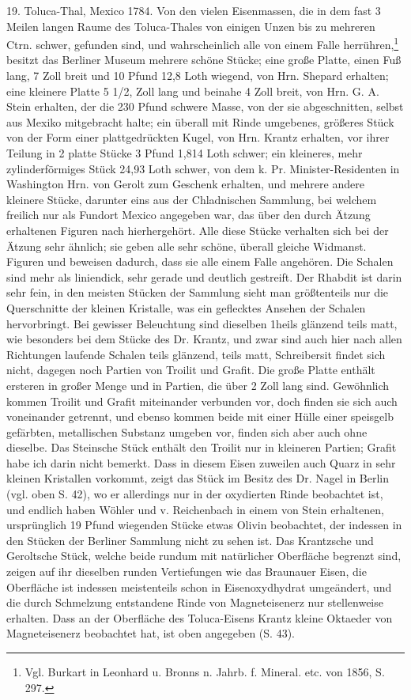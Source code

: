 \documentclass[a4paper, 11pt, oneside]{article}
\begin{document}
19. Toluca-Thal, Mexico 1784. Von den vielen Eisenmassen, die in dem fast 3 Meilen langen Raume des Toluca-Thales von einigen Unzen bis zu mehreren Ctrn. schwer, gefunden sind, und wahrscheinlich alle von einem Falle herrühren,\footnote{Vgl. Burkart in Leonhard u. Bronns n. Jahrb. f. Mineral. etc. von 1856, S. 297.} besitzt das Berliner Museum mehrere schöne Stücke; eine große Platte, einen Fuß lang, 7 Zoll breit und 10 Pfund 12,8 Loth wiegend, von Hrn. Shepard erhalten; eine kleinere Platte 5 1/2, Zoll lang und beinahe 4 Zoll breit, von Hrn. G. A. Stein erhalten, der die 230 Pfund schwere Masse, von der sie abgeschnitten, selbst aus Mexiko mitgebracht halte; ein überall mit Rinde umgebenes, größeres Stück von der Form einer plattgedrückten Kugel, von Hrn. Krantz erhalten, vor ihrer Teilung in 2 platte Stücke 3 Pfund 1,814 Loth schwer; ein kleineres, mehr zylinderförmiges Stück 24,93 Loth schwer, von dem k. Pr. Minister-Residenten in Washington Hrn. von Gerolt zum Geschenk erhalten, und mehrere andere kleinere Stücke, darunter eins aus der Chladnischen Sammlung, bei welchem freilich nur als Fundort Mexico angegeben war, das über den durch Ätzung erhaltenen Figuren nach hierhergehört. Alle diese Stücke verhalten sich bei der Ätzung sehr ähnlich; sie geben alle sehr schöne, überall gleiche Widmanst. Figuren und beweisen dadurch, dass sie alle einem Falle angehören. Die Schalen sind mehr als liniendick, sehr gerade und deutlich gestreift. Der Rhabdit ist darin sehr fein, in den meisten Stücken der Sammlung sieht man größtenteils nur die Querschnitte der kleinen Kristalle, was ein geflecktes Ansehen der Schalen hervorbringt. Bei gewisser Beleuchtung sind dieselben 1heils glänzend teils matt, wie besonders bei dem Stücke des Dr. Krantz, und zwar sind auch hier nach allen Richtungen laufende Schalen teils glänzend, teils matt, Schreibersit findet sich nicht, dagegen noch Partien von Troilit und Grafit. Die große Platte enthält ersteren in großer Menge und in Partien, die über 2 Zoll lang sind. Gewöhnlich kommen Troilit und Grafit miteinander verbunden vor, doch finden sie sich auch voneinander getrennt, und ebenso kommen beide mit einer Hülle einer speisgelb gefärbten, metallischen Substanz umgeben vor, finden sich aber auch ohne dieselbe. Das Steinsche Stück enthält den Troilit nur in kleineren Partien; Grafit habe ich darin nicht bemerkt. Dass in diesem Eisen zuweilen auch Quarz in sehr kleinen Kristallen vorkommt, zeigt das Stück im Besitz des Dr. Nagel in Berlin (vgl. oben S. 42), wo er allerdings nur in der oxydierten Rinde beobachtet ist, und endlich haben Wöhler und v. Reichenbach in einem von Stein erhaltenen, ursprünglich 19 Pfund wiegenden Stücke etwas Olivin beobachtet, der indessen in den Stücken der Berliner Sammlung nicht zu sehen ist. Das Krantzsche und Geroltsche Stück, welche beide rundum mit natürlicher Oberfläche begrenzt sind, zeigen auf ihr dieselben runden Vertiefungen wie das Braunauer Eisen, die Oberfläche ist indessen meistenteils schon in Eisenoxydhydrat umgeändert, und die durch Schmelzung entstandene Rinde von Magneteisenerz nur stellenweise erhalten. Dass an der Oberfläche des Toluca-Eisens Krantz kleine Oktaeder von Magneteisenerz beobachtet hat, ist oben angegeben (S. 43).
\end{document}

